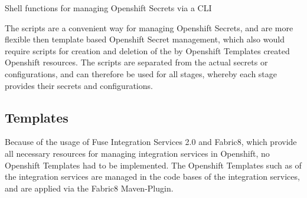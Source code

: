 \begin{listing}[h]
	\caption{Shell functions for managing Openshift Secrets via a CLI}
	\label{ls:esboi-openshift-oc-service}
\end{listing}

The scripts are a convenient way for managing Openshift Secrets, and are more flexible then template based Openshift Secret management, which also would require scripts for creation and deletion of the by Openshift Templates created Openshift resources. The scripts are separated from the actual secrets or configurations, and can therefore be used for all stages, whereby each stage provides their secrets and configurations. 

\subsection{Templates}
\label{sec:esbi-openshift-config}
Because of the usage of Fuse Integration Services 2.0 and Fabric8, which provide all necessary resources for managing integration services in Openshift, no Openshift Templates had to be implemented. The Openshift Templates such as  of the integration services are managed in the code bases of the integration services, and are applied via the Fabric8 Maven-Plugin.



